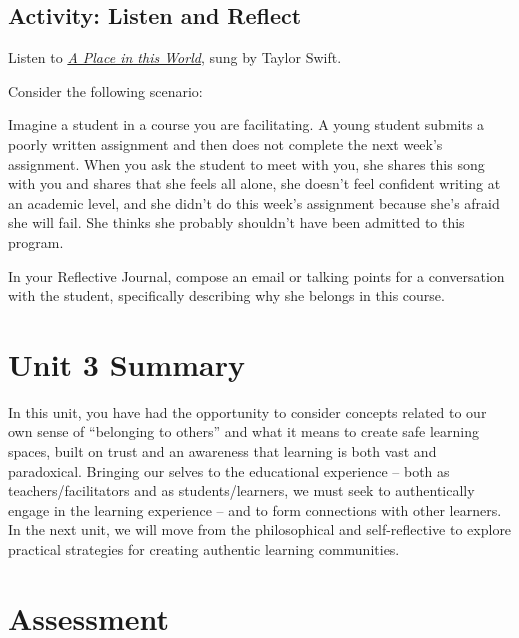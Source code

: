 \documentclass[
]{book}
\begin{document}
\hypertarget{activity-listen-and-reflect-1}{%
\subsection*{Activity: Listen and Reflect}\label{activity-listen-and-reflect-1}}

\begin{reflect}
Listen to \href{https://music.youtube.com/watch?v=_FNQ5qLuLjA\&list=RDAMVM_FNQ5qLuLjA}{\emph{A Place in this World}}, sung by Taylor Swift.

{Consider the following scenario:}

Imagine a student in a course you are facilitating. A young student submits a poorly written assignment and then does not complete the next week's assignment. When you ask the student to meet with you, she shares this song with you and shares that she feels all alone, she doesn't feel confident writing at an academic level, and she didn't do this week's assignment because she's afraid she will fail. She thinks she probably shouldn't have been admitted to this program.

In your Reflective Journal, compose an email or talking points for a conversation with the student, specifically describing why she belongs in this course.
\end{reflect}

\hypertarget{unit-3-summary}{%
\section*{Unit 3 Summary}\label{unit-3-summary}}

In this unit, you have had the opportunity to consider concepts related to our own sense of ``belonging to others'' and what it means to create safe learning spaces, built on trust and an awareness that learning is both vast and paradoxical. Bringing our selves to the educational experience -- both as teachers/facilitators and as students/learners, we must seek to authentically engage in the learning experience -- and to form connections with other learners. In the next unit, we will move from the philosophical and self-reflective to explore practical strategies for creating authentic learning communities.

\hypertarget{assessment-2}{%
\section*{Assessment}\label{assessment-2}}
\end{document}
